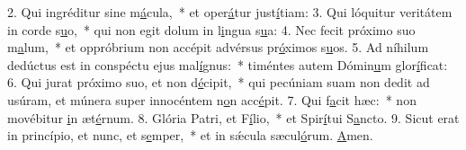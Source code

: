 2. Qui ingréditur sine m\uline{á}cula,~* et oper\uline{á}tur just\uline{í}tiam:
3. Qui lóquitur veritátem in corde s\uline{u}o,~* qui non egit dolum in l\uline{i}ngua s\uline{u}a:
4. Nec fecit próximo suo m\uline{a}lum,~* et oppróbrium non accépit advérsus pr\uline{ó}ximos s\uline{u}os.
5. Ad níhilum dedúctus est in conspéctu ejus mal\uline{í}gnus:~* timéntes autem Dómin\uline{u}m glor\uline{í}ficat:
6. Qui jurat próximo suo, et non d\uline{é}cipit,~* qui pecúniam suam non dedit ad usúram, et múnera super innocéntem n\uline{o}n acc\uline{é}pit.
7. Qui f\uline{a}cit hæc:~* non movébitur \uline{i}n æt\uline{é}rnum.
8. Glória Patri, et F\uline{í}lio,~* et Spir\uline{í}tui S\uline{a}ncto.
9. Sicut erat in princípio, et nunc, et s\uline{e}mper,~* et in sǽcula sæcul\uline{ó}rum. \uline{A}men.
